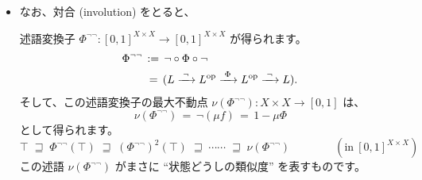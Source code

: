 \documentclass[
		head_space=20mm,
		foot_space=20mm,
		gutter=10mm,
		line_length=190mm
]{jlreq}
\begin{document}
\begin{itemize}
	これは、証拠 (witness) $j$ をもとに、Knaster-Tarski の定理より、以下のしかたで導出されます。
	\begin{prooftree}
		 
	\end{prooftree}\clearpage
	\item なお、対合 (involution) をとると、
	\begin{center}
	\end{center}
	述語変換子 $\Phi^{\lnot\lnot}:[0,1]^{X\times X}\to[0,1]^{X\times X}$ が得られます。
	\begin{align*}
		\Phi^{\lnot\lnot}\,&:=\,\lnot\circ \Phi \circ \lnot \\&\,=\,(L \xrightarrow{\;\lnot\;} L^{\mathrm{op}} \xrightarrow{\;\Phi\;} L^{\mathrm{op}} \xrightarrow{\;\lnot\;} L).
	\end{align*}
	そして、この述語変換子の最大不動点 $\nu(\Phi^{\lnot\lnot}):X\times X\to[0,1]$ は、
	\[\nu(\Phi^{\lnot\lnot})\,=\,\lnot(\mu f)\,=\,1-\mu\Phi\] 
	として得られます。
	\[\top\;\sqsupseteq\;\Phi^{\lnot\lnot}(\top)\;\sqsupseteq\;(\Phi^{\lnot\lnot})^2(\top)\;\sqsupseteq\;\cdots\cdots\;\sqsupseteq\;\nu(\Phi^{\lnot\lnot})\qquad\qquad(\textrm{in}~[0,1]^{X\times X})\]
	この述語 $\nu(\Phi^{\lnot\lnot})$ がまさに ``状態どうしの類似度'' を表すものです。
\end{itemize}
\vspace{30pt}
\end{document}
